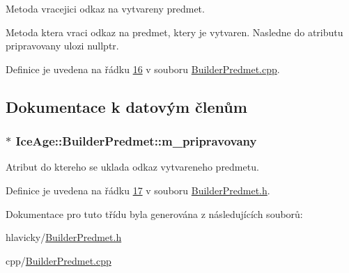 Metoda vracejici odkaz na vytvareny predmet. 

Metoda ktera vraci odkaz na predmet, ktery je vytvaren. Nasledne do atributu pripravovany ulozi nullptr. 

Definice je uvedena na řádku \hyperlink{BuilderPredmet_8cpp_source_l00016}{16} v souboru \hyperlink{BuilderPredmet_8cpp_source}{Builder\+Predmet.\+cpp}.



\subsection{Dokumentace k datovým členům}
\subsubsection[{\texorpdfstring{m\+\_\+pripravovany}{m_pripravovany}}]{$\ast$ Ice\+Age\+::\+Builder\+Predmet\+::m\+\_\+pripravovany\hspace{0.3cm}{\ttfamily [private]}}\hypertarget{classIceAge_1_1BuilderPredmet_ab51158b23493b9c1bb891f8be4a69b5d}{}\label{classIceAge_1_1BuilderPredmet_ab51158b23493b9c1bb891f8be4a69b5d}


Atribut do ktereho se uklada odkaz vytvareneho predmetu. 



Definice je uvedena na řádku \hyperlink{BuilderPredmet_8h_source_l00017}{17} v souboru \hyperlink{BuilderPredmet_8h_source}{Builder\+Predmet.\+h}.



Dokumentace pro tuto třídu byla generována z následujících souborů\+:\begin{DoxyCompactItemize}
\item 
hlavicky/\hyperlink{BuilderPredmet_8h}{Builder\+Predmet.\+h}\item 
cpp/\hyperlink{BuilderPredmet_8cpp}{Builder\+Predmet.\+cpp}\end{DoxyCompactItemize}
